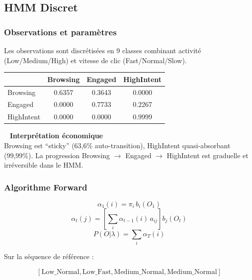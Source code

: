 \documentclass[11pt,a4paper]{article}
\newenvironment{insightbox}{%
  \vspace{3pt}\begin{framed}
  \noindent{\color{NavyBlue}\rule{0.3cm}{3pt}}~%
  \textcolor{NavyBlue}{\textbf{Interprétation économique}}\\[3pt]}
  {\end{framed}\vspace{3pt}}
\begin{document}
\subsection{HMM Discret}

\subsubsection{Observations et paramètres}

Les observations sont discrétisées en 9 classes combinant activité (Low/Medium/High)
et vitesse de clic (Fast/Normal/Slow).

\begin{center}
\begin{tabular}{lccc}
\toprule
& \textbf{Browsing} & \textbf{Engaged} & \textbf{HighIntent} \\
\midrule
\rowcolor{LightBlue}   Browsing   & 0.6357 & 0.3643 & 0.0000 \\
\rowcolor{LightOrange} Engaged    & 0.0000 & 0.7733 & 0.2267 \\
\rowcolor{LightRed}    HighIntent & 0.0000 & 0.0000 & 0.9999 \\
\bottomrule
\end{tabular}
\end{center}

\begin{insightbox}
Browsing est ``sticky'' (63,6\% auto-transition), HighIntent quasi-absorbant (99,99\%).
La progression Browsing $\to$ Engaged $\to$ HighIntent est graduelle et irréversible dans le HMM.
\end{insightbox}

\subsubsection{Algorithme Forward}

\begin{mathBox}
\[
\alpha_1(i)=\pi_i\,b_i(O_1)
\]
\[
\alpha_t(j)=
\left[
\sum_i
\alpha_{t-1}(i)\,a_{ij}
\right]
b_j(O_t)
\]
\[
P(O|\lambda)=\sum_i \alpha_T(i)
\]
\end{mathBox}

Sur la séquence de référence :

\[
[
\text{Low\_Normal},
\text{Low\_Fast},
\text{Medium\_Normal},
\text{Medium\_Normal}
]
\]
\end{document}
